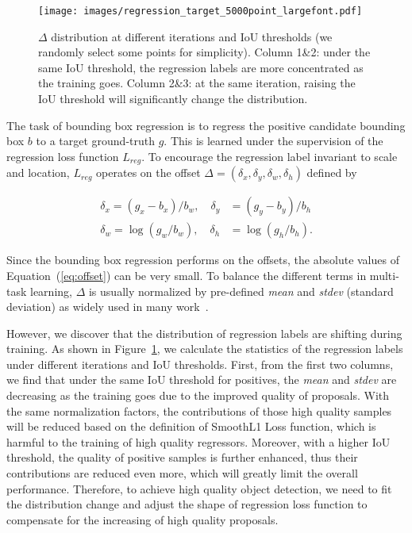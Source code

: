 \documentclass[runningheads]{llncs}
\begin{document}
\begin{figure}[!t]
    \centering
    \texttt{[image: images/regression\_target\_5000point\_largefont.pdf]}
    \caption{$\Delta$ distribution at different iterations and IoU thresholds (we randomly select some points for simplicity). Column 1\&2: under the same IoU threshold, the regression labels are more concentrated as the training goes. Column 2\&3: at the same iteration, raising the IoU threshold will significantly change the distribution.}
    \label{fig:reg_target_over_time}
\end{figure}

The task of bounding box regression is to regress the positive candidate bounding box $b$ to a target ground-truth $g$. This is learned under the supervision of the regression loss function $L_{reg}$. To encourage the regression label invariant to scale and location, $L_{reg}$ operates on the offset $\Delta=(\delta_x, \delta_y, \delta_w, \delta_h)$ defined by

\begin{equation}
    \begin{aligned}
        \delta_x=(g_x-b_x)/b_w, \quad \delta_y&=(g_y-b_y)/b_h\\
        \delta_w=\log(g_w/b_w), \quad \delta_h&=\log(g_h/b_h).
        \label{eq:offset}
    \end{aligned}
\end{equation}

Since the bounding box regression performs on the offsets, the absolute values of Equation~(\ref{eq:offset}) can be very small. To balance the different terms in multi-task learning, $\Delta$ is usually normalized by pre-defined \textit{mean} and \textit{stdev} (standard deviation) as widely used in many work~\cite{FasterRCNN,FPN,MaskRCNN}.

However, we discover that the distribution of regression labels are shifting during training. As shown in Figure~\ref{fig:reg_target_over_time}, we calculate the statistics of the regression labels under different iterations and IoU thresholds. First, from the first two columns, we find that under the same IoU threshold for positives, the \textit{mean} and \textit{stdev} are decreasing as the training goes due to the improved quality of proposals. With the same normalization factors, the contributions of those high quality samples will be reduced based on the definition of SmoothL1 Loss function, which is harmful to the training of high quality regressors.
Moreover, with a higher IoU threshold, the quality of positive samples is further enhanced, thus their contributions are reduced even more, which will greatly limit the overall performance.
Therefore, to achieve high quality object detection, we need to fit the distribution change and adjust the shape of regression loss function to compensate for the increasing of high quality proposals.
\end{document}
